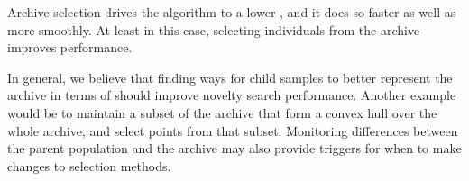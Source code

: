 \documentclass[twoside]{article}
\begin{document}
Archive selection drives the algorithm to a lower , and it does so faster as well as more smoothly.  At least in this case, selecting individuals from the archive improves performance.  

In general, we believe that finding ways for child samples to better represent the archive in terms of \emph{} should improve novelty search performance.  Another example would be to maintain a subset of the archive that form a convex hull over the whole archive, and select points from that subset.  Monitoring  differences between the parent population and the archive may also provide triggers for when to make changes to selection methods.
\end{document}

